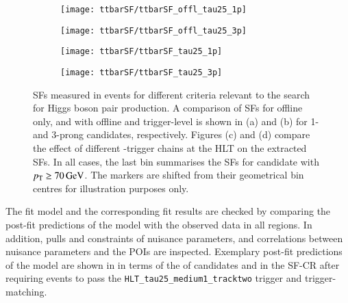 \begin{figure}[htbp]
  \centering

  \begin{subfigure}[t]{.495\textwidth}
    \texttt{[image: ttbarSF/ttbarSF\_offl\_tau25\_1p]}
    \caption{}
    \label{fig:ttbarSF_postfit_SF_a}
  \end{subfigure}\hfill%
  \begin{subfigure}[t]{.495\textwidth}
    \texttt{[image: ttbarSF/ttbarSF\_offl\_tau25\_3p]}
    \caption{}
    \label{fig:ttbarSF_postfit_SF_b}
  \end{subfigure}

  \begin{subfigure}[t]{.495\textwidth}
    \texttt{[image: ttbarSF/ttbarSF\_tau25\_1p]}
    \caption{}
    \label{fig:ttbarSF_postfit_SF_c}
  \end{subfigure}\hfill%
  \begin{subfigure}[t]{.495\textwidth}
    \texttt{[image: ttbarSF/ttbarSF\_tau25\_3p]}
    \caption{}
    \label{fig:ttbarSF_postfit_SF_d}
  \end{subfigure}

  \caption{\Faketauhadvis SFs measured in \ttbar events for different \tauid
    criteria relevant to the search for Higgs boson pair production. A
    comparison of \faketauhadvis SFs for offline \tauid only, and with offline
    and trigger-level \tauid is shown in (a) and (b) for 1- and 3-prong
    \tauhadvis candidates, respectively. Figures (c) and (d) compare the effect
    of different \tauhadvis-trigger chains at the HLT on the extracted SFs. In
    all cases, the last bin summarises the SFs for \tauhadvis candidate with
    $\pT \geq \SI{70}{\GeV}$. The markers are shifted from their geometrical bin
    centres for illustration purposes only.}%
  \label{fig:ttbarSF_postfit_SF}
\end{figure}

The fit model and the corresponding fit results are checked by comparing the
post-fit predictions of the model with the observed data in all regions. In
addition, pulls and constraints of nuisance parameters, and correlations between
nuisance parameters and the POIs are inspected. Exemplary post-fit predictions
of the model are shown in  in terms of the \pT
of \tauhadvis candidates and \mTW in the SF-CR after requiring events to pass
the \texttt{HLT\_tau25\_medium1\_tracktwo} trigger and
trigger-matching.

